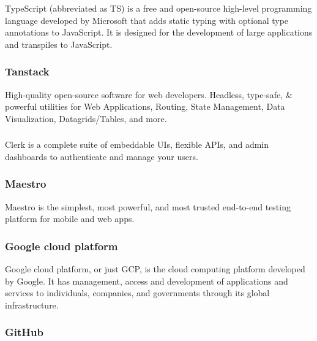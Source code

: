 TypeScript (abbreviated as TS) is a free and open-source high-level programming language developed by Microsoft that adds static typing with optional type annotations to JavaScript. It is designed for the development of large applications and transpiles to JavaScript.

\subsubsection*{\protect{} Tanstack}
                                                                      
High-quality open-source software for web developers. Headless, type-safe, \& powerful utilities for Web Applications, Routing, State Management, Data Visualization, Datagrids/Tables, and more.

\subsubsection*{\protect{}}
                                                                        
Clerk is a complete suite of embeddable UIs, flexible APIs, and admin dashboards to authenticate and manage your users.

\subsubsection*{\protect{} Maestro}
                                                                        
Maestro is the simplest, most powerful, and most trusted end-to-end testing platform for mobile and web apps.

\subsubsection*{\protect{} Google cloud platform}

Google cloud platform, or just GCP, is the cloud computing platform developed by Google. It has management, access and development of applications and services to individuals, companies, and governments through its global infrastructure.

\subsubsection*{\protect{} GitHub}

